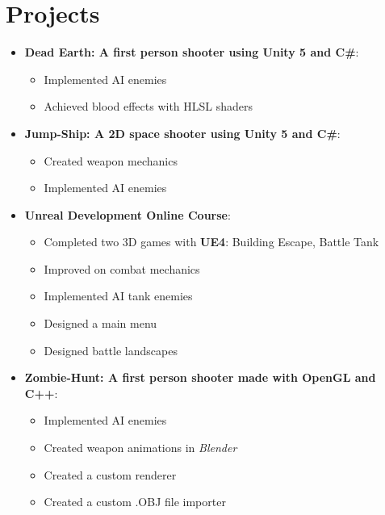 \documentclass[letterpaper,11pt]{article}
\newcommand{\resumeItem}[2]{
	\item\small{
		\textbf{#1}{: #2 \vspace{-2pt}}
	}
}
\newcommand{\resumeSubItem}[2]{\resumeItem{#1}{#2}\vspace{-4pt}}
\newcommand{\resumeSubHeadingListStart}{\begin{itemize}[leftmargin=*]}
\newcommand{\resumeSubHeadingListEnd}{\end{itemize}}
\begin{document}
	\section{Projects}
	\resumeSubHeadingListStart
	\resumeSubItem{Dead Earth: A first person shooter using Unity 5 and C\#}{}
	\begin{multicols}{2}
		\begin{itemize}
			\setlength\itemsep{0em}
			\item Implemented AI enemies
			\item Achieved blood effects with HLSL shaders
		\end{itemize}	
	\end{multicols}
	\vspace*{-5mm}
	\resumeSubItem{Jump-Ship: A 2D space shooter using Unity 5 and C\#}{}
	\begin{multicols}{2}
		\begin{itemize}
			\setlength\itemsep{0em}
			\item Created weapon mechanics
			\item Implemented AI enemies
		\end{itemize}
	\end{multicols}
	\vspace*{-5mm}
	\resumeSubItem{Unreal Development Online Course}{}
	\begin{multicols}{2}
		\begin{itemize}
			\setlength\itemsep{0em}
			\item Completed two 3D games with \textbf{UE4}: Building Escape, Battle Tank
			\item Improved on combat mechanics
			\item Implemented AI tank enemies
			\item Designed a main menu
			\item Designed battle landscapes
			
		\end{itemize}
	\end{multicols}
	\vspace*{-5mm}
	\resumeSubItem{Zombie-Hunt: A first person shooter made with OpenGL and C++}{}
	\begin{multicols}{2}
		\begin{itemize}
			\setlength\itemsep{0em}
			\item Implemented AI enemies
			\item Created weapon animations in \textit{Blender}
			\item Created a custom renderer
			\item Created a custom .OBJ file importer
		\end{itemize}
	\end{multicols}
	\resumeSubHeadingListEnd
	
\end{document}
